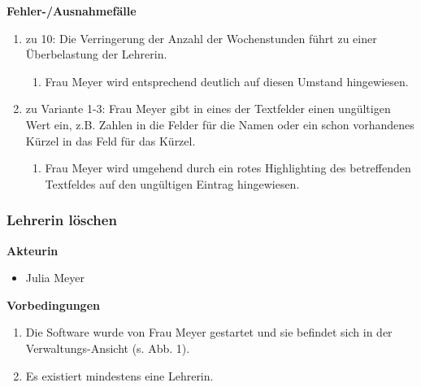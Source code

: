 \documentclass[fontsize=12pt,paper=a4,twoside]{scrartcl}
\begin{document}
\textbf{Fehler-/Ausnahmefälle}
\begin{enumerate}
\item zu 10: Die Verringerung der Anzahl der Wochenstunden führt zu einer Überbelastung der Lehrerin. 
	\begin{enumerate}[label=\arabic*.]
	\item Frau Meyer wird entsprechend deutlich auf diesen Umstand hingewiesen.
	\end{enumerate}
\item zu Variante 1-3: Frau Meyer gibt in eines der Textfelder einen ungültigen Wert ein, z.B. Zahlen in die Felder für die Namen oder ein schon vorhandenes Kürzel in das Feld für das Kürzel.
	\begin{enumerate}[label=\arabic*.]
	\item Frau Meyer wird umgehend durch ein rotes Highlighting des betreffenden Textfeldes auf den ungültigen Eintrag hingewiesen.
	\end{enumerate}
\end{enumerate}

\subsubsection{Lehrerin löschen}
\label{subsubsec:LehrerinLoeschen}

\textbf{Akteurin}
\begin{itemize}
\item Julia Meyer
\end{itemize}
\vspace{5pt}

\textbf{Vorbedingungen}
\begin{enumerate}
\item Die Software wurde von Frau Meyer gestartet und sie befindet sich in der Verwaltungs-Ansicht (s. Abb. 1).
\item Es existiert mindestens eine Lehrerin.
\end{enumerate}
\vspace{5pt}
\end{document}
